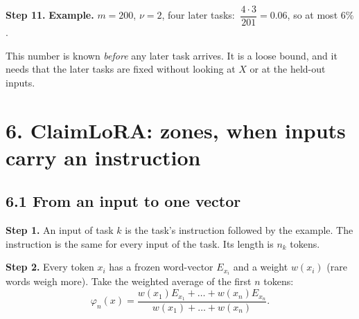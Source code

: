 \documentclass[11pt,a4paper]{article}
\newcommand{\step}[1]{\textbf{Step #1.}}
\begin{document}
\begin{center}
\end{center}

\step{11} \textbf{Example.} $m = 200$, $\nu = 2$, four later tasks:
$\ \dfrac{4 \cdot 3}{201} = 0.06$, so at most $6\%$.

This number is known \emph{before} any later task arrives. It is a loose bound, and it needs that the
later tasks are fixed without looking at $X$ or at the held-out inputs.

\section*{6. ClaimLoRA: zones, when inputs carry an instruction}

\subsection*{6.1 From an input to one vector}

\step{1} An input of task $k$ is the task's instruction followed by the example. The instruction is
the same for every input of the task. Its length is $n_k$ tokens.

\begin{center}
\end{center}

\step{2} Every token $x_i$ has a frozen word-vector $E_{x_i}$ and a weight $w(x_i)$ (rare words weigh
more). Take the weighted average of the first $n$ tokens:
\[ \varphi_n(x) = \frac{w(x_1)E_{x_1} + \dots + w(x_n)E_{x_n}}{w(x_1) + \dots + w(x_n)} . \]

\begin{center}
\end{center}
\end{document}
